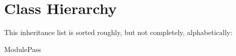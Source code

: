 \section{Class Hierarchy}
This inheritance list is sorted roughly, but not completely, alphabetically\+:\begin{DoxyCompactList}
\item Module\+Pass\begin{DoxyCompactList}
\item {}
\end{DoxyCompactList}
\end{DoxyCompactList}
